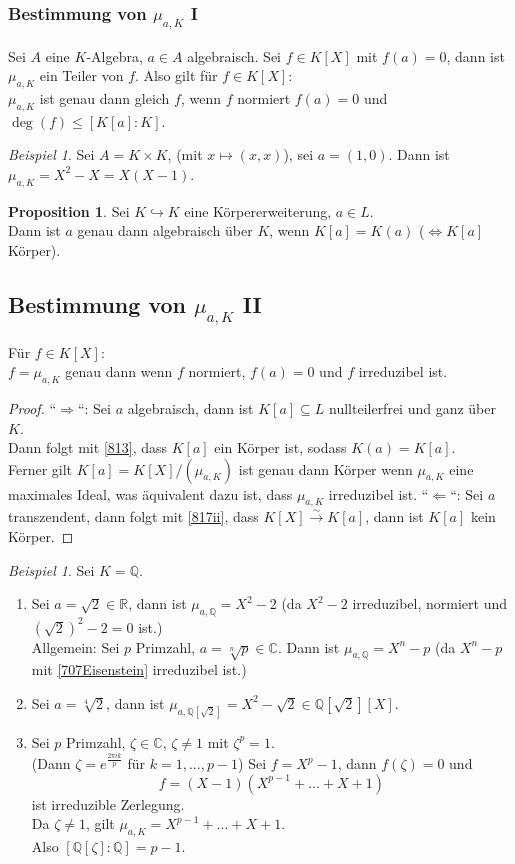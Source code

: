 \documentclass[10pt,a4paper]{article}
\newcommand{\Q}{\ensuremath{\mathbb{Q}}}
\newcommand{\R}{\ensuremath{\mathbb{R}}}
\newcommand{\C}{\ensuremath{\mathbb{C}}}
\newcommand{\isomfunc}{\ensuremath{\xrightarrow{\sim}}}
\newcounter{thm}[section]
\let\oldsubsubsection\subsubsection
\renewcommand{\subsubsection}{\stepcounter{thm}\oldsubsubsection}
\theoremstyle{definition}
\newtheorem{prop}[thm]{Proposition}
\theoremstyle{plain}
\theoremstyle{remark}
\newtheorem{exm}[thm]{Beispiel}
\newtheorem*{exm*}{Beispiel}
\begin{document}
\subsubsection{Bestimmung von $\mu_{a,K}$ I} Sei $A$ eine $K$-Algebra, $a\in A$ algebraisch. Sei $f\in K[X]$ mit $f(a)=0$, dann ist $\mu_{a,K}$ ein Teiler von $f$. Also gilt für $f\in K[X]$:\\
$\mu_{a,K}$ ist genau dann gleich $f$, wenn $f$ normiert $f(a)=0$ und $\deg(f)\leq [K[a]:K]$.

\begin{exm*}
	Sei $A=K\times K$, (mit $x\mapsto (x,x)$), sei $a=(1,0)$. Dann ist $\mu_{a,K}=X^2-X=X(X-1)$.
\end{exm*}

\begin{prop}\label{819Prop}
	Sei $K\hookrightarrow K$ eine Körpererweiterung, $a\in L$.\\
	Dann ist $a$ genau dann algebraisch über $K$, wenn $K[a]=K(a)$ ($\Leftrightarrow K[a]$ Körper).
\end{prop}

\subsection*{Bestimmung von $\mu_{a,K}$ II} Für $f\in K[X]$:\\
$f=\mu_{a,K}$ genau dann wenn $f$ normiert, $f(a)=0$ und $f$ irreduzibel ist.
\begin{proof}
	``$\Rightarrow$``: Sei $a$ algebraisch, dann ist $K[a]\subseteq L$ nullteilerfrei und ganz über $K$.\\
	Dann folgt mit \ref{813}, dass $K[a]$ ein Körper ist, sodass $K(a)=K[a]$.\\
	Ferner gilt $K[a]=K[X]/(\mu_{a,K})$ ist genau dann Körper wenn $\mu_{a,K}$ eine maximales Ideal, 
	was äquivalent dazu ist, dass $\mu_{a,K}$ irreduzibel ist.
	``$\Leftarrow$``: Sei $a$ transzendent, dann folgt mit \ref{817ii}, dass $K[X]\isomfunc K[a]$, dann ist $K[a]$ kein Körper.
\end{proof}


\begin{exm}
	Sei $K=\Q$.\begin{enumerate}
		\item Sei $a=\sqrt 2\in \R$, dann ist $\mu_{a,\Q}=X^2-2$ (da $X^2-2$ irreduzibel, normiert und $(\sqrt{ 2})^2-2=0$ ist.)\\
		Allgemein: Sei $p$ Primzahl, $a=\sqrt[n]{p}\in\C$. Dann ist $\mu_{a,\Q}=X^n-p$ (da $X^n-p$ mit \ref{707Eisenstein} irreduzibel ist.)
		\item Sei $a=\sqrt[4]{2}$, dann ist $\mu_{a,\Q[\sqrt{2}]}=X^2-\sqrt{2}\in \Q[\sqrt{2}][X]$.
		\item Sei $p$ Primzahl, $\zeta\in\C$, $\zeta\neq 1$ mit $\zeta^p=1$.\\
		(Dann $\zeta=e^{\frac{2\pi i k}{p}}$ für $k=1,...,p-1$)
		Sei $f=X^p-1$, dann $f(\zeta)=0$ und
		\[f=(X-1)(X^{p-1}+...+X+1)\]
		ist irreduzible Zerlegung.\\
		Da $\zeta\neq 1$, gilt $\mu_{a,K}=X^{p-1}+...+X+1$.\\
		Also $[\Q[\zeta]:\Q]=p-1$.
	\end{enumerate}
\end{exm}
\end{document}

